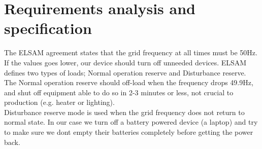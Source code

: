 \chapter[Requirements]{Requirements analysis and specification}
\label{chap:requirements}
The ELSAM agreement states that the grid frequency at all times must be 50Hz. If the values goes lower, our device should turn off unneeded devices. ELSAM defines two types of loads; Normal operation reserve and Disturbance reserve.\\
The Normal operation reserve should off-load when the frequency drops 49.9Hz, and shut off equipment able to do so in 2-3 minutes or less, not crucial to production (e.g. heater or lighting).\\ 
Disturbance reserve mode is used when the grid frequency does not return to normal state. In our case we turn off a battery powered device (a laptop) and try to make sure we dont empty their batteries completely before getting the power back.

